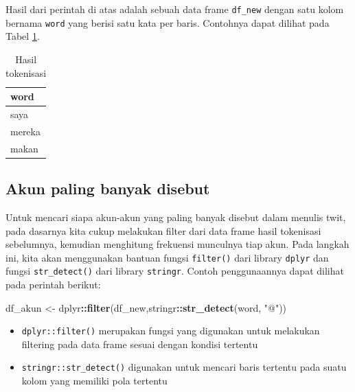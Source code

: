 \documentclass[]{book}
\newenvironment{Shaded}{\begin{snugshade}}{\end{snugshade}}
\newcommand{\KeywordTok}[1]{\textcolor[rgb]{0.13,0.29,0.53}{\textbf{#1}}}
\newcommand{\NormalTok}[1]{#1}
\newcommand{\OperatorTok}[1]{\textcolor[rgb]{0.81,0.36,0.00}{\textbf{#1}}}
\newcommand{\StringTok}[1]{\textcolor[rgb]{0.31,0.60,0.02}{#1}}
\providecommand{\tightlist}{%
  \setlength{\itemsep}{0pt}\setlength{\parskip}{0pt}}
\begin{document}
Hasil dari perintah di atas adalah sebuah data frame \texttt{df\_new}
dengan satu kolom bernama \texttt{word} yang berisi satu kata per baris.
Contohnya dapat dilihat pada Tabel \ref{tab:table1}.

\begin{table}

\caption{\label{tab:table1}Hasil tokenisasi}
\centering
\begin{tabular}[t]{l}
\hline
word\\
\hline
saya\\
\hline
mereka\\
\hline
makan\\
\hline
\end{tabular}
\end{table}

\hypertarget{akun-paling-banyak-disebut}{%
\subsection{Akun paling banyak
disebut}\label{akun-paling-banyak-disebut}}

Untuk mencari siapa akun-akun yang paling banyak disebut dalam menulis
twit, pada dasarnya kita cukup melakukan filter dari data frame hasil
tokenisasi sebelumnya, kemudian menghitung frekuensi munculnya tiap
akun. Pada langkah ini, kita akan menggunakan bantuan fungsi
\texttt{filter()} dari library \texttt{dplyr} dan fungsi
\texttt{str\_detect()} dari library \texttt{stringr}. Contoh
penggunaannya dapat dilihat pada perintah berikut:

\begin{Shaded}
\begin{Highlighting}[]
\NormalTok{df_akun <-}\StringTok{ }\NormalTok{dplyr}\OperatorTok{::}\KeywordTok{filter}\NormalTok{(df_new,stringr}\OperatorTok{::}\KeywordTok{str_detect}\NormalTok{(word, }\StringTok{"@"}\NormalTok{))}
\end{Highlighting}
\end{Shaded}

\begin{itemize}
\tightlist
\item
  \texttt{dplyr::filter()} merupakan fungsi yang digunakan untuk
  melakukan filtering pada data frame sesuai dengan kondisi tertentu
\item
  \texttt{stringr::str\_detect()} digunakan untuk mencari baris tertentu
  pada suatu kolom yang memiliki pola tertentu
\end{itemize}
\end{document}

